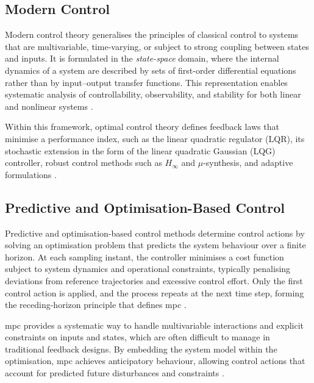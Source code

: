\subsection{Modern Control}

Modern control theory generalises the principles of classical control to systems that are multivariable, time-varying, or subject to strong coupling between states and inputs. 
It is formulated in the \textit{state-space} domain, where the internal dynamics of a system are described by sets of first-order differential equations rather than by input--output transfer functions. 
This representation enables systematic analysis of controllability, observability, and stability for both linear and nonlinear systems \cite{kailathLinearSystems1980}. 

Within this framework, optimal control theory defines feedback laws that minimise a performance index, such as the linear quadratic regulator (LQR), its stochastic extension in the form of the linear quadratic Gaussian (LQG) controller, robust control methods such as $H_{\infty}$ and $\mu$-synthesis, and adaptive formulations \cite{andersonOptimalControlLinear1990,zhouRobustOptimalControl1996,astromAdaptiveControlKarl1995}.


\subsection{Predictive and Optimisation-Based Control}

Predictive and optimisation-based control methods determine control actions by solving an optimisation problem that predicts the system behaviour over a finite horizon. 
At each sampling instant, the controller minimises a cost function subject to system dynamics and operational constraints, typically penalising deviations from reference trajectories and excessive control effort. 
Only the first control action is applied, and the process repeats at the next time step, forming the receding-horizon principle that defines \gls{mpc} \cite{camachoModelPredictiveControl2007}.  

\gls{mpc} provides a systematic way to handle multivariable interactions and explicit constraints on inputs and states, which are often difficult to manage in traditional feedback designs. 
By embedding the system model within the optimisation, \gls{mpc} achieves anticipatory behaviour, allowing control actions that account for predicted future disturbances and constraints \cite{rawlingsModelPredictiveControl2020,mayneConstrainedModelPredictive2000}.  

